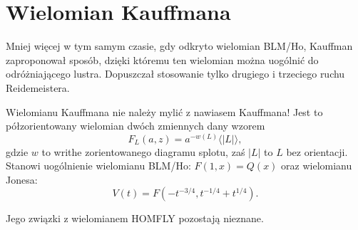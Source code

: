 \section{Wielomian Kauffmana} %
\label{sec:kauffman_polynomial}
Mniej więcej w tym samym czasie, gdy odkryto wielomian BLM/Ho, Kauffman zaproponował sposób, dzięki któremu ten wielomian można uogólnić do odróżniającego lustra.
Dopuszczał stosowanie tylko drugiego i trzeciego ruchu Reidemeistera.

Wielomianu Kauffmana nie należy mylić z nawiasem Kauffmana!
Jest to półzorientowany wielomian dwóch zmiennych dany wzorem
\[
	F_L(a, z) = a^{-w(L)} \langle |L| \rangle,
\]
gdzie $w$ to writhe zorientowanego diagramu splotu, zaś $|L|$ to $L$ bez orientacji.
Stanowi uogólnienie wielomianu BLM/Ho: $F(1, x) = Q(x)$ oraz wielomianu Jonesa:
\[
	V(t)=F(-t^{-3/4},t^{-1/4}+t^{1/4}).
\]

Jego związki z wielomianem HOMFLY pozostają nieznane.
